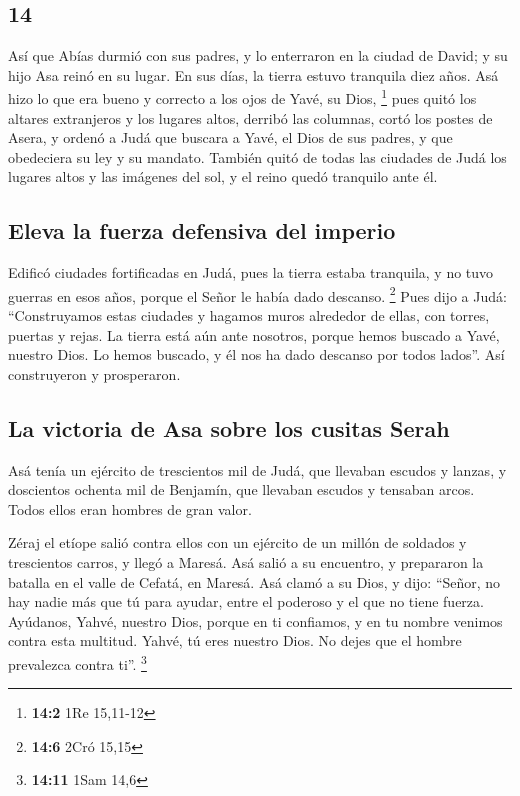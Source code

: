 \begin{paracol}{2}
\hypertarget{section-26}{%
\section{14}\label{section-26}}

 Así que Abías durmió con sus padres, y lo enterraron en
la ciudad de David; y su hijo Asa reinó en su lugar. En sus días, la
tierra estuvo tranquila diez años.  Asá hizo lo que era
bueno y correcto a los ojos de Yavé, su Dios, \footnote{\textbf{14:2}
  1Re 15,11-12}  pues quitó los altares extranjeros y los
lugares altos, derribó las columnas, cortó los postes de Asera,
 y ordenó a Judá que buscara a Yavé, el Dios de sus
padres, y que obedeciera su ley y su mandato.  También
quitó de todas las ciudades de Judá los lugares altos y las imágenes del
sol, y el reino quedó tranquilo ante él.

\hypertarget{eleva-la-fuerza-defensiva-del-imperio}{%
\subsection{Eleva la fuerza defensiva del
imperio}\label{eleva-la-fuerza-defensiva-del-imperio}}

 Edificó ciudades fortificadas en Judá, pues la tierra
estaba tranquila, y no tuvo guerras en esos años, porque el Señor le
había dado descanso. \footnote{\textbf{14:6} 2Cró 15,15} 
Pues dijo a Judá: ``Construyamos estas ciudades y hagamos muros
alrededor de ellas, con torres, puertas y rejas. La tierra está aún ante
nosotros, porque hemos buscado a Yavé, nuestro Dios. Lo hemos buscado, y
él nos ha dado descanso por todos lados''. Así construyeron y
prosperaron.

\hypertarget{la-victoria-de-asa-sobre-los-cusitas-serah}{%
\subsection{La victoria de Asa sobre los cusitas
Serah}\label{la-victoria-de-asa-sobre-los-cusitas-serah}}

 Asá tenía un ejército de trescientos mil de Judá, que
llevaban escudos y lanzas, y doscientos ochenta mil de Benjamín, que
llevaban escudos y tensaban arcos. Todos ellos eran hombres de gran
valor.

 Zéraj el etíope salió contra ellos con un ejército de un
millón de soldados y trescientos carros, y llegó a Maresá.
 Asá salió a su encuentro, y prepararon la batalla en el
valle de Cefatá, en Maresá.  Asá clamó a su Dios, y dijo:
``Señor, no hay nadie más que tú para ayudar, entre el poderoso y el que
no tiene fuerza. Ayúdanos, Yahvé, nuestro Dios, porque en ti confiamos,
y en tu nombre venimos contra esta multitud. Yahvé, tú eres nuestro
Dios. No dejes que el hombre prevalezca contra ti''. \footnote{\textbf{14:11}
  1Sam 14,6}


\end{paracol}
